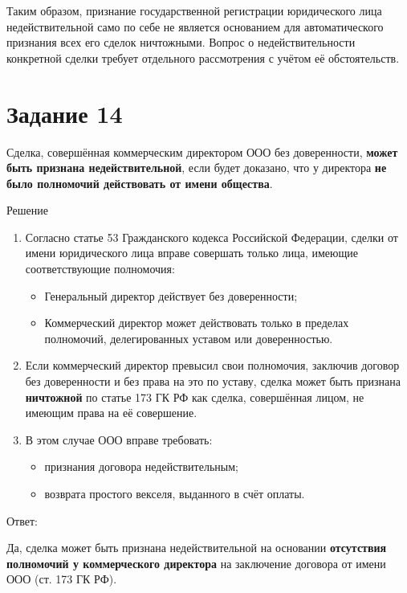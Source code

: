\documentclass[14pt,a4paper]{extarticle}
\begin{document}
Таким образом, признание государственной регистрации юридического лица
недействительной само по себе не является основанием для автоматического
признания всех его сделок ничтожными. Вопрос о недействительности конкретной
сделки требует отдельного рассмотрения с учётом её обстоятельств.

\section{Задание 14}

Сделка, совершённая коммерческим директором ООО без доверенности, \textbf{может быть признана недействительной}, если будет доказано, что у директора \textbf{не было полномочий действовать от имени общества}.

Решение

\begin{enumerate}
    \item Согласно статье 53 Гражданского кодекса Российской Федерации, сделки от имени юридического лица вправе совершать только лица, имеющие соответствующие полномочия:
    \begin{itemize}
        \item Генеральный директор действует без доверенности;
        \item Коммерческий директор может действовать только в пределах полномочий, делегированных уставом или доверенностью.
    \end{itemize}
    \item Если коммерческий директор превысил свои полномочия, заключив договор без доверенности и без права на это по уставу, сделка может быть признана \textbf{ничтожной} по статье 173 ГК РФ как сделка, совершённая лицом, не имеющим права на её совершение.
    \item В этом случае ООО вправе требовать:
    \begin{itemize}
        \item признания договора недействительным;
        \item возврата простого векселя, выданного в счёт оплаты.
    \end{itemize}
\end{enumerate}

Ответ:

Да, сделка может быть признана недействительной на основании \textbf{отсутствия полномочий у коммерческого директора} на заключение договора от имени ООО (ст. 173 ГК РФ).
\end{document}

